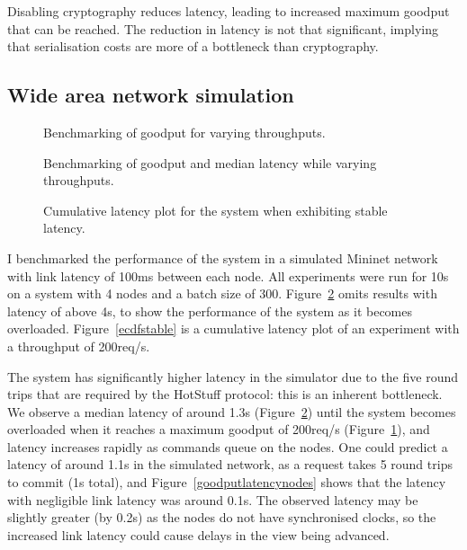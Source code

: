 Disabling cryptography reduces latency, leading to increased maximum goodput that can be reached. The reduction in latency is not that significant, implying that serialisation costs are more of a bottleneck than cryptography.

\subsection{Wide area network simulation} \label{minineteval}

\begin{figure}[h!]
\centering
\resizebox{.6\textwidth}{!}{}
\caption{Benchmarking of goodput for varying throughputs.}
\label{throughoutgoodputmininet}
\end{figure}

\begin{figure}[h!]
\centering
\resizebox{.5\textwidth}{!}{}
\caption{Benchmarking of goodput and median latency while varying throughputs.}
\label{goodputlatencymininet}
\end{figure}

\begin{figure}[h!]
\centering
\resizebox{.6\textwidth}{!}{}
\caption{Cumulative latency plot for the system when exhibiting stable latency.}
\label{ecdfmininet}
\end{figure}

I benchmarked the performance of the system in a simulated Mininet network~\cite{mininet,lantzNetworkLaptopRapid2010} with link latency of 100ms between each node. All experiments were run for 10s on a system with 4 nodes and a batch size of 300. Figure~\ref{goodputlatencymininet} omits results with latency of above 4s, to show the performance of the system as it becomes overloaded. Figure~\ref{ecdfstable} is a cumulative latency plot of an experiment with a throughput of 200req/s.

The system has significantly higher latency in the simulator due to the five round trips that are required by the HotStuff protocol: this is an inherent bottleneck. We observe a median latency of around 1.3s (Figure~\ref{goodputlatencymininet}) until the system becomes overloaded when it reaches a maximum goodput of 200req/s (Figure~\ref{throughoutgoodputmininet}), and latency increases rapidly as commands queue on the nodes. One could predict a latency of around 1.1s in the simulated network, as a request takes 5 round trips to commit (1s total), and Figure~\ref{goodputlatencynodes} shows that the latency with negligible link latency was around 0.1s. The observed latency may be slightly greater (by 0.2s) as the nodes do not have synchronised clocks, so the increased link latency could cause delays in the view being advanced.

